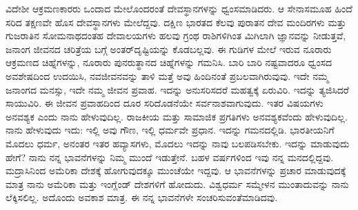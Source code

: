 ವಿದೇಶೀ ಆಕ್ರಮಣಕಾರರು ಒಂದಾದ ಮೇಲೊಂದರಂತೆ ದೇವಸ್ಥಾನಗಳನ್ನು ಧ್ವಂಸಮಾಡಿದರು. ಆ ಸೇನಾಸಮೂಹ ಹಿಂದೆ ಸರಿದ ತಕ್ಷಣವೇ ಹೊಸ ದೇವಸ್ಥಾನಗಳು ಮೇಲೆದ್ದವು. ದಕ್ಷಿಣ ಭಾರತದ ಕೆಲವು ಪುರಾತನ ದೇವ ಮಂದಿರಗಳು ಮತ್ತು ಗುಜರಾತಿನ ಸೋಮನಾಥದಂತಹ ದೇವಾಲಯಗಳು ಹಲವು ಗ್ರಂಥ ರಾಶಿಗಳಿಗಿಂತ ಮಿಗಿಲಾಗಿ ಜ್ಞಾನವನ್ನು ನೀಡುತ್ತವೆ, ಜನಾಂಗ ಜೀವನದ ಚರಿತ್ರೆಯ ಬಗ್ಗೆ ಅಂತರ್​ದೃಷ್ಟಿಯನ್ನು ಕೊಡಬಲ್ಲವು. ಈ ಗುಡಿಗಳ ಮೇಲೆ ಇರುವ ನೂರಾರು ಆಕ್ರಮಣದ ಚಿಹ್ನೆಗಳನ್ನು, ನೂರಾರು ಪುನರು\-ತ್ಥಾನದ ಚಿಹ್ನೆಗಳನ್ನು ಗಮನಿಸಿ. ಬಾರಿ ಬಾರಿ ನಷ್ಟವಾದರೂ ಧ್ವಂಸದ ಅವಶೇಷದಿಂದ ಉದಯಿಸಿ, ನವಜೀವನವನ್ನು ತಾಳಿ ಮತ್ತೆ ಅವು ಹಿಂದಿನಂತೆ ಪ್ರಬಲವಾಗಿರುವುವು. ಇದೇ ನಮ್ಮ ಜನಾಂಗದ ಮನಸ್ಸು, ಇದೇ ನಮ್ಮ ಜೀವನ ಪ್ರವಾಹ. ಇದನ್ನು ಅನುಸರಿಸದರೆ ಮಹತ್ವಕ್ಕೆ ಏರುವಿರಿ. ಇದನ್ನು ತ್ಯಜಿಸಿದರೆ ಸಾಯುವಿರಿ. ಈ ಜೀವನ ಪ್ರವಾಹದಿಂದ ದೂರ ಸರಿದೊಡನೆಯೇ ಸರ್ವನಾಶ\-ವಾಗುವುದು. ಇತರ ವಿಷಯಗಳು ಅನವಶ್ಯಕ ಎಂದು ನಾನು ಹೇಳುವುದಿಲ್ಲ. ರಾಜಕೀಯ ಮತ್ತು ಸಾಮಾಜಿಕ ಪ್ರಗತಿಗಳು ಅನವಶ್ಯಕವೆಂದು ಹೇಳುವುದಿಲ್ಲ. ನಾನು ಹೇಳುವುದು ಇದು: ಇಲ್ಲಿ ಅವು ಗೌಣ, ಇಲ್ಲಿ ಧರ್ಮವೇ ಪ್ರಧಾನ. ಇದನ್ನು ಗಮನದಲ್ಲಿಡಿ. ಭಾರತೀಯನಿಗೆ ಮೊದಲು ಧರ್ಮ, ಅನಂತರ ಇತರ ಹವ್ಯಾಸಗಳು, ಮೊದಲು ಇದನ್ನು ನಾವು ಬಲಪಡಿಸಬೇಕು. ಇದನ್ನು ಮಾಡುವುದು ಹೇಗೆ? ನಾನು ನನ್ನ ಭಾವನೆಗಳನ್ನು ನಿಮ್ಮ ಮುಂದೆ ಇಡುತ್ತೇನೆ. ಬಹಳ ವರ್ಷಗಳಿಂದ ಇವು ನನ್ನ ಮನದಲ್ಲಿದ್ದವು. ಮದ್ರಾಸಿನಿಂದ ಅಮೆರಿಕಾ ದೇಶಕ್ಕೆ ಹೋಗುವುದಕ್ಕೂ ಮುಂಚೆಯೇ ಇದ್ದವು. ಆ ಭಾವನೆಗಳನ್ನು ಪ್ರಚಾರ ಮಾಡುವುದಕ್ಕೆ ಮಾತ್ರ ನಾನು ಅಮೆರಿಕಾ ಮತ್ತು ಇಂಗ್ಲೆಂಡ್​ ದೇಶಗಳಿಗೆ ಹೋದುದು. ವಿಶ್ವಧರ್ಮ ಸಮ್ಮೇಳನ ಮುಂತಾದುವನ್ನು ನಾನು ಲೆಕ್ಕಿಸಲಿಲ್ಲ. ಅದೊಂದು ಅವಕಾಶ ಮಾತ್ರ. ಈ ನನ್ನ ಭಾವನೆಗಳೇ ಸಂಚರಿಸುವಂತೆಮಾಡಿದವು.

